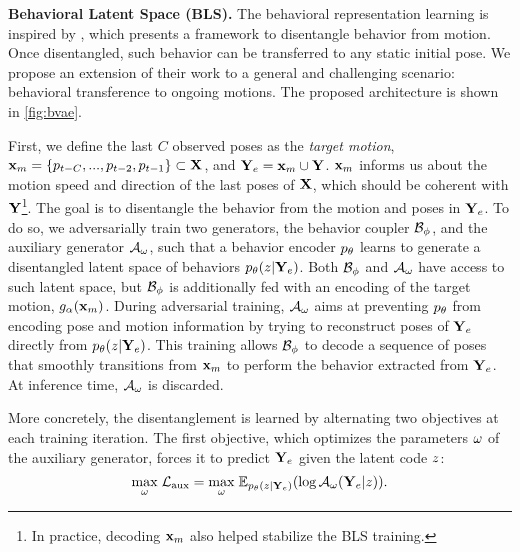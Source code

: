 \documentclass[10pt,twocolumn,letterpaper]{article}
\begin{document}
\textbf{Behavioral Latent Space (BLS).} The behavioral representation learning is inspired by \cite{blattmann2021behavior}, which presents a framework to disentangle behavior from motion. Once disentangled, such behavior can be transferred to any static initial pose. We propose an extension of their work to a general and challenging scenario: behavioral transference to ongoing motions. The proposed architecture is shown in \autoref{fig:bvae}.

First, we define the last $C$ observed poses as the \textit{target motion}, $\mathbf{x}_{m}=\{p_{t-C}, ..., p_{t-2}, p_{t-1}\}\subset \mathbf{X}$, and $\mathbf{Y}_{e}=\mathbf{x}_{m} \cup \mathbf{Y}$.  $\mathbf{x}_{m}$ informs us about the motion speed and direction of the last poses of $\mathbf{X}$, which should be coherent with $\mathbf{Y}$\footnote{In practice, decoding $\mathbf{x}_{m}$ also helped stabilize the BLS training.}. The goal is to disentangle the behavior from the motion and poses in $\mathbf{Y}_{e}$. To do so, we adversarially train two generators, the behavior coupler $\mathcal{B}_{\phi}$, and the auxiliary generator $\mathcal{A}_{\omega}$, such that a behavior encoder $p_{\theta}$ learns to generate a disentangled latent space of behaviors $p_{\theta} (z|\mathbf{Y}_{e})$. Both $\mathcal{B}_{\phi}$ and $\mathcal{A}_{\omega}$ have access to such latent space, but $\mathcal{B}_{\phi}$ is additionally fed with an encoding of the target motion, $g_{\alpha}( \mathbf{x}_{m} )$. During adversarial training, $\mathcal{A}_{\omega}$ aims at preventing $p_{\theta}$ from encoding pose and motion information by trying to reconstruct poses of $\mathbf{Y}_{e}$ directly from $p_{\theta} (z|\mathbf{Y}_{e})$. This training allows $\mathcal{B}_{\phi}$ to decode a sequence of poses that smoothly transitions from $\mathbf{x}_{m}$ to perform the behavior extracted from $\mathbf{Y}_{e}$. At inference time, $\mathcal{A}_{\omega}$ is discarded.

More concretely, the disentanglement is learned by alternating two objectives at each training iteration. The first objective, which optimizes the parameters $\omega$ of the auxiliary generator, forces it to predict $\mathbf{Y}_{e}$ given the latent code $z$:
\vspace{-0.2cm}
\begin{equation}
\label{eq:bvae_aux_loss}
     \underset{\bvaeAuxDecParams}{\max}\; \mathcal{L}_{\text{aux}} = \underset{\bvaeAuxDecParams}{\max}\; \mathbb{E}_{\bvaeEnc(\latcode|\extPred)} (\log \bvaeAuxDec(\extPred |\latcode)).
     \vspace{-0.2cm}
\end{equation}
\end{document}
